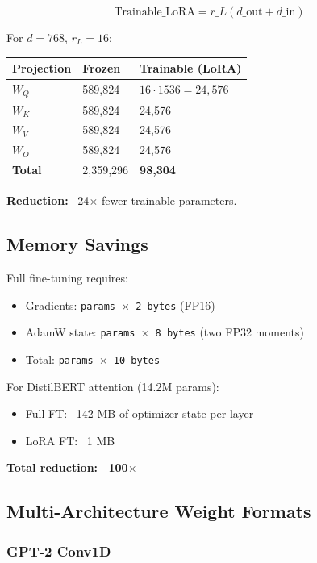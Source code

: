 \[
\text{Trainable}\_\text{LoRA} = r\_L (d\_\text{out} + d\_\text{in})
\tag{3.6}
\]

For $d = 768$, $r_L = 16$:

\begin{table}[H]
\centering
\small
\begin{tabular}{lll}
\toprule
\textbf{Projection} & \textbf{Frozen} & \textbf{Trainable (LoRA)} \\
\midrule
$W_Q$ & 589,824 & $16 \cdot 1536 = 24,576$ \\
$W_K$ & 589,824 & 24,576 \\
$W_V$ & 589,824 & 24,576 \\
$W_O$ & 589,824 & 24,576 \\
\textbf{Total} & 2,359,296 & \textbf{98,304} \\
\bottomrule
\end{tabular}
\end{table}

\textbf{Reduction:} ~24$\times$ fewer trainable parameters.

\subsection{Memory Savings}

Full fine-tuning requires:
\begin{itemize}
\item Gradients: \texttt{params $\times$ 2 bytes} (FP16)
\item AdamW state: \texttt{params $\times$ 8 bytes} (two FP32 moments)
\item Total: \texttt{params $\times$ 10 bytes}

\end{itemize}
For DistilBERT attention (14.2M params):
\begin{itemize}
\item Full FT: ~142 MB of optimizer state per layer
\item LoRA FT: ~1 MB

\end{itemize}
\textbf{Total reduction: ~100$\times$}

\subsection{Multi-Architecture Weight Formats}

\subsubsection{GPT-2 Conv1D}

